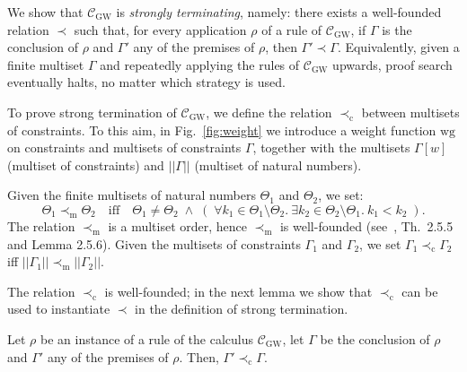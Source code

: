 \documentclass[copyright,creativecommons]{eptcs}
\newcommand{\Calcw}{\Ccal_{\mathrm{GW}}}
\newcommand{\IFF}{\Longleftrightarrow}
\newcommand{\precm}{\prec_{\mathrm{m}}}
\newcommand{\precc}{\prec_{\mathrm{c}}}
\newcommand{\size}[1]{|#1|}
\newcommand{\sizem}[1]{||#1||}
\newcommand{\wgname}{\mathrm{wg}}
\newcommand{\wg}[1]{\mathrm{wg}(#1)}
\newcommand{\G}{\Gamma}
\newcommand{\Ccal}{\mathcal{C}}
\begin{document}
\noindent
We show that $\Calcw$ is \emph{strongly terminating}, namely: there
exists a well-founded relation $\prec$ such that, for every
application $\rho$ of a rule of $\Calcw$, if $\G$ is the conclusion of
$\rho$ and $\G'$ any of the premises of $\rho$, then $\G'\prec \G$.
Equivalently, given a finite multiset $\G$ and repeatedly applying the
rules of $\Calcw$ upwards, proof search eventually halts, no matter
which strategy is used.

To prove strong termination of $\Calcw$, we define the relation
$\precc$ between multisets of constraints.  To this aim, in
Fig.~\ref{fig:weight} we introduce a weight function $\wgname$ on
constraints and multisets of constraints $\G$, together with the
multisets $\G[w]$ (multiset of constraints) and $\sizem{\G}$ (multiset
of natural numbers).




Given the finite multisets of natural numbers
$\Theta_1$ and $\Theta_2$,  we set:%
\[
\Theta_1 \precm \Theta_2
\quad\mbox{iff}\quad
\Theta_1\neq
\Theta_2 \;\land\; \left(\; \forall k_1 \in \Theta_1\setminus
  \Theta_2.\ \exists k_2\in \Theta_2 \setminus \Theta_1.\ k_1 < k_2
  \;\right).
\]  
The relation $\precm$ is a multiset order, hence $\precm$ is
well-founded (see~\cite{BaaderN:98}, Th.~2.5.5 and Lemma 2.5.6).
Given the multisets of constraints $\G_1$ and $\G_2$,
we set $\G_1 \precc \G_2$ iff  $\sizem{\G_1} \precm\sizem{\G_2}$. 





The relation $\precc$ is well-founded;
in the next lemma we show that  $\precc$ 
can be used to instantiate $\prec$ in the definition of strong termination.


\begin{lemma}\label{lemma:rulesDec}
  Let $\rho$ be an instance of a rule of the calculus $\Calcw$, let
  $\Gamma$ be the conclusion of $\rho$ and  $\G'$ any of the premises of $\rho$.
  Then,  $\G'\precc \G$.
\end{lemma}
\end{document}
